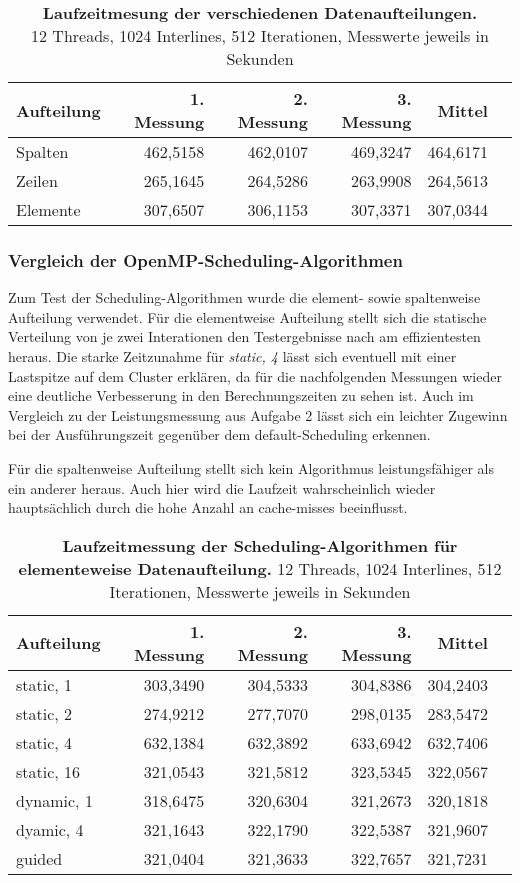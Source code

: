 \documentclass[a4paper,12pt]{scrartcl}
\begin{document}
\begin{table}[!h]
\begin{tabular}{|l|r|r|r|r|r|}
\hline
Aufteilung&1. Messung&2. Messung&3. Messung&Mittel\\
\hline
Spalten	&462,5158	&462,0107	&469,3247	&464,6171\\
\hline
Zeilen	&265,1645	&264,5286	&263,9908	&264,5613\\
\hline
Elemente	&307,6507	&306,1153	&307,3371	&307,0344\\
\hline
\end{tabular}
\caption{\textbf{Laufzeitmesung der verschiedenen Datenaufteilungen.}\\ 12 Threads, 1024 Interlines, 512 Iterationen, Messwerte jeweils in Sekunden}
\end{table}

\subsubsection*{Vergleich der OpenMP-Scheduling-Algorithmen}
Zum Test der Scheduling-Algorithmen wurde die element- sowie spaltenweise Aufteilung verwendet. Für die elementweise Aufteilung stellt sich die statische Verteilung von je zwei Interationen den Testergebnisse nach am effizientesten heraus. Die starke Zeitzunahme für \textit{static, 4} lässt sich eventuell mit einer Lastspitze auf dem Cluster erklären, da für die nachfolgenden Messungen wieder eine deutliche Verbesserung in den Berechnungszeiten zu sehen ist. Auch im Vergleich zu der Leistungsmessung aus Aufgabe 2 lässt sich ein leichter Zugewinn bei der Ausführungszeit gegenüber dem default-Scheduling erkennen.

Für die spaltenweise Aufteilung stellt sich kein Algorithmus leistungsfähiger als ein anderer heraus. Auch hier wird die Laufzeit wahrscheinlich wieder hauptsächlich durch die hohe Anzahl an cache-misses beeinflusst.


\begin{table}[!h]
\begin{tabular}{|l|r|r|r|r|r|}
\hline
Aufteilung&1. Messung&2. Messung&3. Messung&Mittel\\
\hline
static, 1&	303,3490&	304,5333&	304,8386&	304,2403\\
\hline
static, 2	&274,9212	&277,7070	&298,0135	&283,5472\\
\hline
static, 4	&632,1384	&632,3892	&633,6942	&632,7406\\
\hline
static, 16	&321,0543	&321,5812	&323,5345	&322,0567\\
\hline
dynamic, 1	&318,6475	&320,6304	&321,2673	&320,1818\\
\hline
dyamic, 4	&321,1643	&322,1790	&322,5387	&321,9607\\
\hline
guided	&321,0404	&321,3633	&322,7657	&321,7231\\

\hline
\end{tabular}
\caption{\textbf{Laufzeitmessung der Scheduling-Algorithmen für \\elementeweise Datenaufteilung.} 12 Threads, 1024 Interlines, 512 \\Iterationen, Messwerte jeweils in Sekunden}
\end{table}
\end{document}
